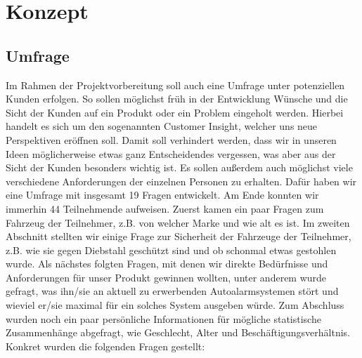 \section{Konzept}
\subsection{Umfrage}
Im Rahmen der Projektvorbereitung soll auch eine Umfrage unter potenziellen Kunden erfolgen. So sollen möglichst früh in der Entwicklung Wünsche und die Sicht der Kunden auf ein Produkt oder ein Problem eingeholt werden. Hierbei handelt es sich um den sogenannten Customer Insight, welcher uns neue Perspektiven eröffnen soll. Damit soll verhindert werden, dass wir in unseren Ideen möglicherweise etwas ganz Entscheidendes vergessen, was aber aus der Sicht der Kunden besonders wichtig ist. Es sollen außerdem auch möglichst viele verschiedene Anforderungen der einzelnen Personen zu erhalten. Dafür haben wir eine Umfrage mit insgesamt 19 Fragen entwickelt. Am Ende konnten wir immerhin 44 Teilnehmende aufweisen.
Zuerst kamen ein paar Fragen zum Fahrzeug der Teilnehmer, z.B. von welcher Marke und wie alt es ist. Im zweiten Abschnitt stellten wir einige Frage zur Sicherheit der Fahrzeuge der Teilnehmer, z.B. wie sie gegen Diebstahl geschützt sind und ob schonmal etwas gestohlen wurde. Als nächstes folgten Fragen, mit denen wir direkte Bedürfnisse und Anforderungen für unser Produkt gewinnen wollten, unter anderem wurde gefragt, was ihn/sie an aktuell zu erwerbenden Autoalarmsystemen stört und wieviel er/sie maximal für ein solches System ausgeben würde. Zum Abschluss wurden noch ein paar persönliche Informationen für mögliche statistische Zusammenhänge abgefragt, wie Geschlecht, Alter und Beschäftigungsverhältnis.
Konkret wurden die folgenden Fragen gestellt:

